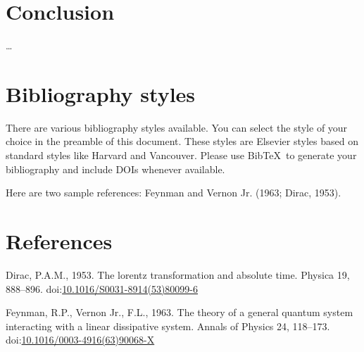 \documentclass[]{elsarticle} %
\newlength{\cslhangindent}
\newenvironment{cslreferences}%
  {\setlength{\parindent}{0pt}%
  \everypar{\setlength{\hangindent}{\cslhangindent}}\ignorespaces}%
  {\par}
\begin{document}
\hypertarget{conclusion}{%
\section{Conclusion}\label{conclusion}}

\ldots{}

\hypertarget{bibliography-styles}{%
\section{Bibliography styles}\label{bibliography-styles}}

There are various bibliography styles available. You can select the
style of your choice in the preamble of this document. These styles are
Elsevier styles based on standard styles like Harvard and Vancouver.
Please use BibTeX~to generate your bibliography and include DOIs
whenever available.

Here are two sample references: Feynman and Vernon Jr. (1963; Dirac,
1953).

\hypertarget{references}{%
\section*{References}\label{references}}

\hypertarget{refs}{}
\begin{cslreferences}
\leavevmode\hypertarget{ref-Dirac1953888}{}%
Dirac, P.A.M., 1953. The lorentz transformation and absolute time.
Physica 19, 888--896.
doi:\href{https://doi.org/10.1016/S0031-8914(53)80099-6}{10.1016/S0031-8914(53)80099-6}

\leavevmode\hypertarget{ref-Feynman1963118}{}%
Feynman, R.P., Vernon Jr., F.L., 1963. The theory of a general quantum
system interacting with a linear dissipative system. Annals of Physics
24, 118--173.
doi:\href{https://doi.org/10.1016/0003-4916(63)90068-X}{10.1016/0003-4916(63)90068-X}
\end{cslreferences}
\end{document}
